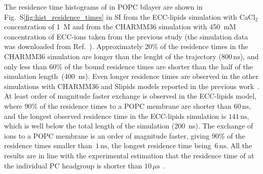 \documentclass[aip,jcp,twocolumn]{revtex4}
\begin{document}
The residence time histograms of 
in POPC bilayer are shown in Fig.~S\ref{fig:hist_residence_times} in SI 
from the ECC-lipids simulation with CaCl$_2$ concentration of 1~M
and from the CHARMM36 simulation with 450~mM concentration of
ECC-ions taken from the previous study \cite{javanainen17}
(the simulation data was downloaded from Ref.~).
Approximately 20\% of the  residence times in the CHARMM36 simulation are longer than
the lenght of the trajectory ($800\,\mathrm{ns}$),
and only less than 60\% of the bound residence times are shorter than the half
of the simulation length~(400~ns).
Even longer residence times are observed
in the other simulations with CHARMM36 and Slipids models reported in the previous work~\cite{javanainen17}.
At least order of magnitude faster exchange is observed in the
ECC-lipids model, where 90\% of the  residence times to a POPC membrane are 
shorter than $60\,\mathrm{ns}$, %
and the longest observed residence time in the ECC-lipids simulation is $141\,\mathrm{ns}$, 
which is well below the total length of the simulation (200~ns).
The exchange of  ions to a POPC membrane is
an order of magnitude faster, giving 90\%
of the residence times smaller than~$1\,\mathrm{ns}$,
the longest residence time being~$6\,\mathrm{ns}$. 
All the results are in line with the experimental estimation that 
the residence time of  at the individual PC headgroup 
is shorter than $10\,\mu\mathrm{s}$~\cite{altenbach84}.


\end{document}
